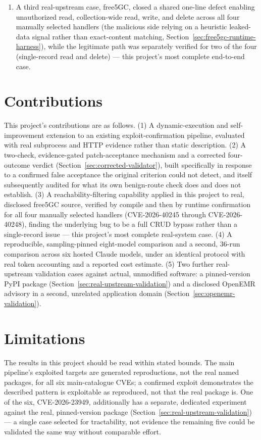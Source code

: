 \documentclass[12pt,a4paper]{report}
\begin{document}
\begin{enumerate}
\item A third real-upstream case, free5GC, closed a shared one-line defect enabling unauthorized read, collection-wide read, write, and delete across all four manually selected handlers (the malicious side relying on a heuristic leaked-data signal rather than exact-content matching, Section~\ref{sec:free5gc-runtime-harness}), while the legitimate path was separately verified for two of the four (single-record read and delete) — this project's most complete end-to-end case.
\end{enumerate}

\section{Contributions}

This project's contributions are as follows. (1) A dynamic-execution and self-improvement extension to an existing exploit-confirmation pipeline, evaluated with real subprocess and HTTP evidence rather than static description. (2) A two-check, evidence-gated patch-acceptance mechanism and a corrected four-outcome verdict (Section~\ref{sec:corrected-validator}), built specifically in response to a confirmed false acceptance the original criterion could not detect, and itself subsequently audited for what its own benign-route check does and does not establish. (3) A reachability-filtering capability applied in this project to real, disclosed free5GC source, verified by compile and then by runtime confirmation for all four manually selected handlers (CVE-2026-40245 through CVE-2026-40248), finding the underlying bug to be a full CRUD bypass rather than a single-record issue — this project's most complete real-system case. (4) A reproducible, sampling-pinned eight-model comparison and a second, 36-run comparison across six hosted Claude models, under an identical protocol with real token accounting and a reported cost estimate. (5) Two further real-upstream validation cases against actual, unmodified software: a pinned-version PyPI package (Section~\ref{sec:real-upstream-validation}) and a disclosed OpenEMR advisory in a second, unrelated application domain (Section~\ref{sec:openemr-validation}).

\section{Limitations}

The results in this project should be read within stated bounds. The main pipeline's exploited targets are generated reproductions, not the real named packages, for all six main-catalogue CVEs; a confirmed exploit demonstrates the described pattern is exploitable as reproduced, not that the real package is. One of the six, CVE-2026-23949, additionally has a separate, dedicated experiment against the real, pinned-version package (Section~\ref{sec:real-upstream-validation}) — a single case selected for tractability, not evidence the remaining five could be validated the same way without comparable effort.
\end{document}
